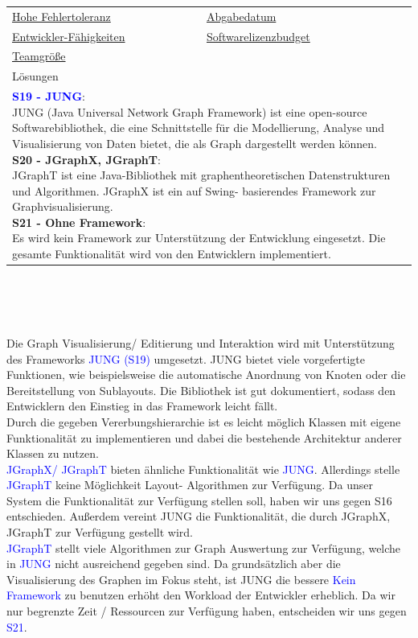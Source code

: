 \documentclass[enabledeprecatedfontcommands,fontsize=11pt,paper=a4,twoside]{scrartcl}
\newcounter{one}
\newcounter{two}[one]
\newcommand{\cb}[1]{{\textcolor{blue}{#1}}}
\begin{document}
\begin{tabular} {|p{8cm} p{8cm}|}
	\hyperlink {tt}{Hohe Fehlertoleranz} &
	\hyperlink {uu}{Abgabedatum} \\
	\hyperlink {vv}{Entwickler-Fähigkeiten} &
	\hyperlink {ww}{Softwarelizenzbudget} \\
	\hyperlink {xx}{Teamgröße} &
	\\ \hline
	\multicolumn{2}{|l|}{Lösungen} \\
	\multicolumn{2}{|l|}{\parbox{16cm}{
			\textbf{\cb{\hypertarget{eee}{S19 - JUNG}}}: \\
			JUNG (Java Universal Network Graph Framework) ist eine open-source Softwarebibliothek, die eine Schnittstelle für die Modellierung, Analyse und Visualisierung von Daten bietet, die als Graph dargestellt werden können. \\
			\textbf{S20 - JGraphX, JGraphT}: \\
			JGraphT ist eine Java-Bibliothek mit graphentheoretischen Datenstrukturen und Algorithmen. JGraphX ist ein auf Swing- basierendes Framework zur Graphvisualisierung. \\
			\textbf{S21 - Ohne Framework}: \\
			Es wird kein Framework zur Unterstützung der Entwicklung eingesetzt. Die gesamte Funktionalität wird von den Entwicklern implementiert.
	} }\\ [11ex] \hline
\end{tabular}\\ \\ \\
\begin{onehalfspace}
	Die Graph Visualisierung/ Editierung und Interaktion wird mit Unterstützung des Frameworks \cb{JUNG (S19)} umgesetzt. JUNG bietet viele vorgefertigte Funktionen, wie beispielsweise die automatische Anordnung von Knoten oder die Bereitstellung von Sublayouts. Die Bibliothek ist gut dokumentiert, sodass den Entwicklern den Einstieg in das Framework leicht fällt. \\
	Durch die gegeben Vererbungshierarchie ist es leicht möglich Klassen mit eigene Funktionalität zu implementieren und dabei die bestehende Architektur anderer Klassen zu nutzen. \\
	\cb{JGraphX/ JGraphT} bieten ähnliche Funktionalität wie \cb{JUNG}. Allerdings stelle \cb{JGraphT} keine Möglichkeit Layout- Algorithmen zur Verfügung. Da unser System die Funktionalität zur Verfügung stellen soll, haben wir uns gegen S16 entschieden. Außerdem vereint JUNG die Funktionalität, die durch JGraphX, JGraphT zur Verfügung gestellt wird.\\
	\cb{JGraphT} stellt viele Algorithmen zur Graph Auswertung zur Verfügung, welche in \cb{JUNG} nicht ausreichend gegeben sind. Da grundsätzlich aber die Visualisierung des Graphen im Fokus steht, ist JUNG die bessere 
	\cb{Kein Framework} zu benutzen erhöht den Workload der Entwickler erheblich. Da wir nur begrenzte Zeit / Ressourcen zur Verfügung haben, entscheiden wir uns gegen \cb{S21}.
\end{onehalfspace}
\end{document}

